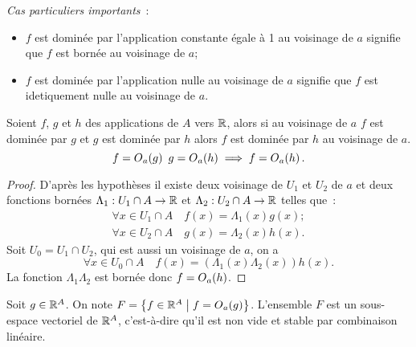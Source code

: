 \emph{Cas particuliers importants}~:
\begin{itemize}
  \item \(f\) est dominée par l'application constante égale à 1 au voisinage de \(a\) signifie que \(f\) est bornée au voisinage de \(a\);
  \item \(f\) est dominée par l'application nulle au voisinage de \(a\) signifie que \(f\) est idetiquement nulle au voisinage de \(a\).
\end{itemize}

\begin{prop}[Transitivité]
  Soient \(f\), \(g\) et \(h\) des applications de \(A\) vers \(\mathbb{R}\), alors si au voisinage de \(a\) \(f\) est dominée par \(g\) et \(g\) est dominée par \(h\) alors \(f\) est dominée par \(h\) au voisinage de \(a\).
  \begin{equation}
    f=O\mathopen{}_{a}\left(g\right) \ g=O\mathopen{}_{a}\left(h\right) \implies f=O\mathopen{}_{a}\left(h\right).
  \end{equation}
\end{prop}
\begin{proof}
  D'après les hypothèses il existe deux voisinage de \(U_1\) et \(U_2\) de \(a\) et deux fonctions bornées \(\Lambda_1:U_1 \cap A \rightarrow \mathbb{R}\) et \(\Lambda_2:U_2 \cap A \rightarrow \mathbb{R}\) telles que~:
  \begin{gather}
    \forall x \in U_1\cap A \quad f(x)=\Lambda_1(x)g(x);\\
    \forall x \in U_2\cap A \quad g(x)=\Lambda_2(x)h(x).
  \end{gather}
  Soit \(U_0=U_1 \cap U_2\), qui est aussi un voisinage de \(a\), on a
  \begin{equation}
    \forall x \in U_0 \cap A \quad f(x) = (\Lambda_1(x) \Lambda_2(x)) h(x).
  \end{equation}
  La fonction \(\Lambda_1 \Lambda_2\) est bornée donc \(f=O\mathopen{}_{a}\left(h\right)\).
\end{proof}
\begin{prop}
  Soit \(g \in \mathbb{R}^A\). On note \(F=\left\{f \in \mathbb{R}^A\mathrel{}\middle|\mathrel{}f=O\mathopen{}_{a}\left(g\right)\right\}\). L'ensemble \(F\) est un sous-espace vectoriel de \(\mathbb{R}^A\), c'est-à-dire qu'il est non vide et stable par combinaison linéaire.
\end{prop}
